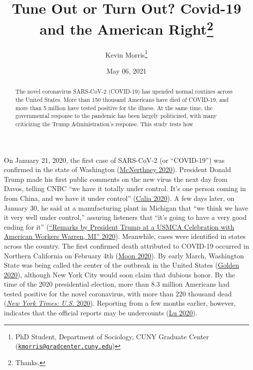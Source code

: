 \documentclass[
  12pt,
]{article}
\title{Tune Out or Turn Out? Covid-19 and the American Right\thanks{Thanks.}}
\author{Kevin Morris\footnote{PhD Student, Department of Sociology, CUNY Graduate Center (\href{mailto:kmorris@gradcenter.cuny.edu}{\nolinkurl{kmorris@gradcenter.cuny.edu}})}}
\date{May 06, 2021}
\begin{document}
\maketitle
\begin{abstract}
The novel coronavirus SARS-CoV-2 (COVID-19) has upended normal routines across the United States. More than 150 thousand Americans have died of COVID-19, and more than 5 million have tested positive for the illness. At the same time, the governmental response to the pandemic has been largely politicized, with many criticizing the Trump Administration's response. This study tests how
\end{abstract}

\pagebreak

\doublespacing

On January 21, 2020, the first case of SARS-CoV-2 (or ``COVID-19'') was confirmed in the state of Washington (\protect\hyperlink{ref-McNerthney2020}{McNerthney 2020}). President Donald Trump made his first public comments on the new virus the next day from Davos, telling CNBC ``we have it totally under control. It's one person coming in from China, and we have it under control'' (\protect\hyperlink{ref-Calia2020}{Calia 2020}). A few days later, on January 30, he said at a manufacturing plant in Michigan that ``we think we have it very well under control,'' assuring listeners that ``it's going to have a very good ending for it'' (\protect\hyperlink{ref-whitehouse2020}{{``Remarks by {President Trump} at a {USMCA Celebration} with {American Workers} \textbar{} {Warren}, {MI}''} 2020}). Meanwhile, cases were identified in states across the country. The first confirmed death attributed to COVID-19 occurred in Northern California on February 4th (\protect\hyperlink{ref-Moon2020}{Moon 2020}). By early March, Washington State was being called the center of the outbreak in the United States (\protect\hyperlink{ref-Golden2020}{Golden 2020}), although New York City would soon claim that dubious honor. By the time of the 2020 presidential election, more than 8.3 million Americans had tested positive for the novel coronavirus, with more than 220 thousand dead (\protect\hyperlink{ref-nyt2020}{\emph{New York Times: U.S.} 2020}). Reporting from a few months earlier, however, indicates that the official reports may be undercounts (\protect\hyperlink{ref-Lu2020}{Lu 2020}).
\end{document}
